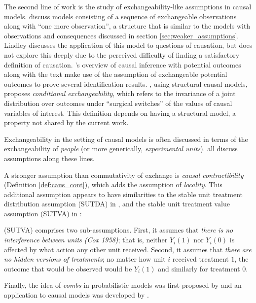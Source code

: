 The second line of work is the study of exchangeability-like assumptions in causal models. \citet{lindley_role_1981} discuss models consisting of a sequence of exchangeable observations along with ``one more observation'', a structure that is similar to the models with observations and consequences discussed in section \ref{sec:weaker_assumptions}. Lindley discusses the application of this model to questions of causation, but does not explore this deeply due to the perceived difficulty of finding a satisfactory definition of causation. \citet{rubin_causal_2005}'s overview of causal inference with potential outcomes along with the text \citet{imbens_causal_2015} make use of the assumption of exchangeable potential outcomes to prove several identification results. \citet{saarela_role_2020}, using structural causal models, proposes \emph{conditional exchangeability}, which refers to the invariance of a joint distribution over outcomes under ``surgical switches'' of the values of causal variables of interest. This definition depends on having a structural model, a property not shared by the current work.

Exchangeability in the setting of causal models is often discussed in terms of the exchangeability of \emph{people} (or more generically, \emph{experimental units}). \citet{hernan_beyond_2012,greenland_identifiability_1986,banerjee_chapter_2017,dawid_decision-theoretic_2020} all discuss assumptions along these lines.

A stronger assumption than commutativity of exchange is \emph{causal contractibility} (Definition \ref{def:caus_cont}), which adds the assumption of \emph{locality}. This additional assumption appears to have similarities to the stable unit treatment distribution assumption (SUTDA) in \citet{dawid_decision-theoretic_2020}, and the stable unit treatment value assumption (SUTVA) in \citep{rubin_causal_2005}:
\begin{blockquote}
(SUTVA) comprises two sub-assumptions. First, it assumes that \emph{there is no interference between units (Cox 1958)}; that is, neither $Y_i(1)$ nor $Y_i(0)$ is affected by what action any other unit received. Second, it assumes that \emph{there are no hidden versions of treatments}; no matter how unit $i$ received treatment $1$, the outcome that would be observed would be $Y_i(1)$ and similarly for treatment $0$.
\end{blockquote}

Finally, the idea of \emph{combs} in probabilistic models was first proposed by \citet{chiribella_quantum_2008} and an application to causal models was developed by \citet{jacobs_causal_2019}.

